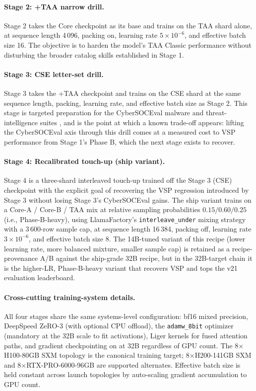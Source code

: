\documentclass[unnumsec,webpdf,contemporary,large]{oup-authoring-template}
\theoremstyle{thmstyleone}
\theoremstyle{thmstyletwo}
\theoremstyle{thmstylethree}
\begin{document}
\paragraph{Stage 2: +TAA narrow drill.}
Stage 2 takes the Core checkpoint as its base and trains on the TAA shard alone, at sequence length 4\,096, packing on, learning rate $5 \times 10^{-6}$, and effective batch size 16. The objective is to harden the model's TAA Classic performance without disturbing the broader catalog skills established in Stage 1.

\paragraph{Stage 3: CSE letter-set drill.}
Stage 3 takes the +TAA checkpoint and trains on the CSE shard at the same sequence length, packing, learning rate, and effective batch size as Stage 2. This stage is targeted preparation for the CyberSOCEval malware and threat-intelligence suites \cite{cybersoceval2025}, and is the point at which a known trade-off appears: lifting the CyberSOCEval axis through this drill comes at a measured cost to VSP performance from Stage 1's Phase B, which the next stage exists to recover.

\paragraph{Stage 4: Recalibrated touch-up (ship variant).}
Stage 4 is a three-shard interleaved touch-up trained off the Stage 3 (CSE) checkpoint with the explicit goal of recovering the VSP regression introduced by Stage 3 without losing Stage 3's CyberSOCEval gains. The ship variant trains on a Core-A / Core-B / TAA mix at relative sampling probabilities $0.15 / 0.60 / 0.25$ (i.e., Phase-B-heavy), using LlamaFactory's \texttt{interleave\_under} mixing strategy with a 3\,600-row sample cap, at sequence length 16\,384, packing off, learning rate $3 \times 10^{-6}$, and effective batch size 8. The 14B-tuned variant of this recipe (lower learning rate, more balanced mixture, smaller sample cap) is retained as a recipe-provenance A/B against the ship-grade 32B recipe, but in the 32B-target chain it is the higher-LR, Phase-B-heavy variant that recovers VSP and tops the v21 evaluation leaderboard.

\paragraph{Cross-cutting training-system details.}
All four stages share the same systems-level configuration: bf16 mixed precision, DeepSpeed ZeRO-3 (with optional CPU offload), the \texttt{adamw\_8bit} optimizer (mandatory at the 32B scale to fit activations), Liger kernels for fused attention paths, and gradient checkpointing on at 32B regardless of GPU count. The 8$\times$H100-80GB SXM topology is the canonical training target; 8$\times$H200-141GB SXM and 8$\times$RTX-PRO-6000-96GB are supported alternates. Effective batch size is held constant across launch topologies by auto-scaling gradient accumulation to GPU count.
\end{document}
